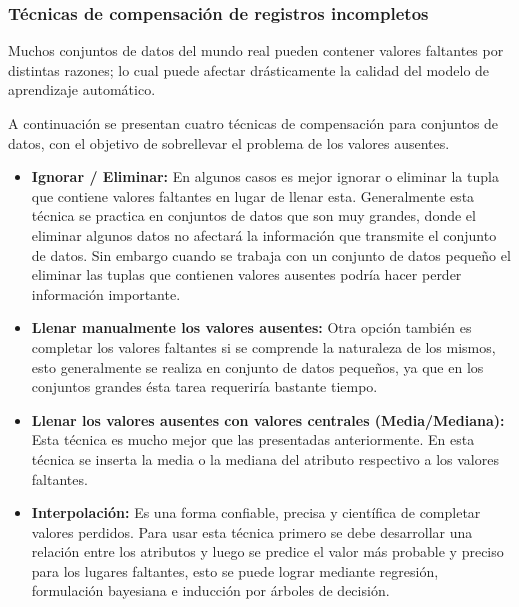 \subsubsection{T\'{e}cnicas de compensaci\'{o}n de registros incompletos}

Muchos conjuntos de datos del mundo real pueden contener valores faltantes por distintas razones; lo cual puede afectar drásticamente la calidad del modelo de aprendizaje automático. 

A continuaci\'{o}n se presentan cuatro t\'{e}cnicas de compensaci\'{o}n para conjuntos de datos, con el objetivo de sobrellevar el problema de los valores ausentes.

\begin{itemize}
\item \textbf{Ignorar / Eliminar:} En algunos casos es mejor ignorar o eliminar la tupla que contiene valores faltantes en lugar de llenar esta. Generalmente esta t\'{e}cnica se practica en conjuntos de datos que son muy grandes, donde el eliminar algunos datos no afectar\'{a} la informaci\'{o}n que transmite el conjunto de datos. Sin embargo cuando se trabaja con un conjunto de datos peque\~{n}o el eliminar las tuplas que contienen valores ausentes podr\'{i}a hacer perder informaci\'{o}n importante.

\item \textbf{Llenar manualmente los valores ausentes:} Otra opci\'{o}n tambi\'{e}n es completar los valores faltantes si se comprende la naturaleza de los mismos, esto generalmente se realiza en conjunto de datos peque\~{n}os, ya que en los conjuntos grandes \'{e}sta tarea requerir\'{i}a bastante tiempo.

\item \textbf{Llenar los valores ausentes con valores centrales (Media/Mediana):} Esta t\'{e}cnica es mucho mejor que las presentadas anteriormente. En esta t\'{e}cnica se inserta la media o la mediana del atributo respectivo a los valores faltantes. 

\item \textbf{Interpolaci\'{o}n:} Es una forma confiable, precisa y cient\'{i}fica de completar valores perdidos. Para usar esta t\'{e}cnica primero se debe desarrollar una relaci\'{o}n entre los atributos y luego se predice el valor m\'{a}s probable y preciso para los lugares faltantes, esto se puede lograr mediante regresi\'{o}n, formulaci\'{o}n bayesiana e inducci\'{o}n por \'{a}rboles de decisi\'{o}n.

\end{itemize}

